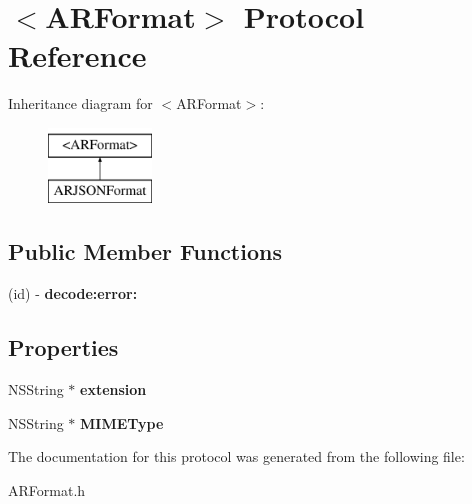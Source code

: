 \hypertarget{a00003}{
\section{$<$\-A\-R\-Format$>$ \-Protocol \-Reference}
\label{a00003}
}
\-Inheritance diagram for $<$\-A\-R\-Format$>$\-:\begin{figure}[H]
\begin{center}
\leavevmode
\includegraphics[height=2.000000cm]{a00003}
\end{center}
\end{figure}
\subsection*{\-Public \-Member \-Functions}
\begin{DoxyCompactItemize}
\item 
\hypertarget{a00003_a098607d2f1ef2eae36c8b84739acf8ab}{
(id) -\/ {\bfseries decode\-:error\-:}}
\label{a00003_a098607d2f1ef2eae36c8b84739acf8ab}

\end{DoxyCompactItemize}
\subsection*{\-Properties}
\begin{DoxyCompactItemize}
\item 
\hypertarget{a00003_a989116d2fad841d0be2c3b3eb6bfb7a2}{
\-N\-S\-String $\ast$ {\bfseries extension}}
\label{a00003_a989116d2fad841d0be2c3b3eb6bfb7a2}

\item 
\hypertarget{a00003_a9a813454eaf1aed359c5ee60457ad78b}{
\-N\-S\-String $\ast$ {\bfseries \-M\-I\-M\-E\-Type}}
\label{a00003_a9a813454eaf1aed359c5ee60457ad78b}

\end{DoxyCompactItemize}


\-The documentation for this protocol was generated from the following file\-:\begin{DoxyCompactItemize}
\item 
\-A\-R\-Format.\-h\end{DoxyCompactItemize}
